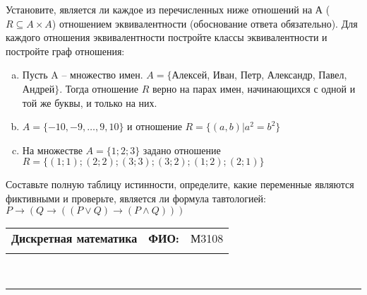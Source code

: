 \documentclass[10pt]{exam}
\newcommand{\class}{Дискретная математика}
\newcommand{\examdate}{}
\begin{document}
\begin{questions}
\question
Установите, является ли каждое из перечисленных ниже отношений на А ($R \subseteq A \times A$) отношением эквивалентности (обоснование ответа обязательно). Для каждого отношения эквивалентности постройте классы 
эквивалентности и постройте граф отношения:
\begin{enumerate} [a)]\setcounter{enumi}{0}
\item Пусть A – множество имен. $A = \{ $Алексей, Иван, Петр, Александр, Павел, Андрей$ \}$. Тогда отношение $R$ верно на парах имен, начинающихся с одной и той же буквы, и только на них.
\item $A = \{-10, -9, … , 9, 10\}$ и отношение $ R = \{(a,b)|a^{2} = b^{2}\}$
\item На множестве $A = \{1; 2; 3\}$ задано отношение $R = \{(1; 1); (2; 2); (3; 3); (3; 2); (1; 2); (2; 1)\}$
\end{enumerate}\question Составьте полную таблицу истинности, определите, какие переменные являются фиктивными и проверьте, является ли формула тавтологией:
$ P \rightarrow (Q \rightarrow ((P \lor Q) \rightarrow (P \land Q)))$

\end{questions}
\newpage
\begin{flushright}
\begin{tabular}{p{2.8in} r l}
\textbf{\class} & \textbf{ФИО:} &М3108
\\

\textbf{\examdate} &&\\
\end{tabular}\\
\end{flushright}
\rule[1ex]{\textwidth}{.1pt}
\end{document}
